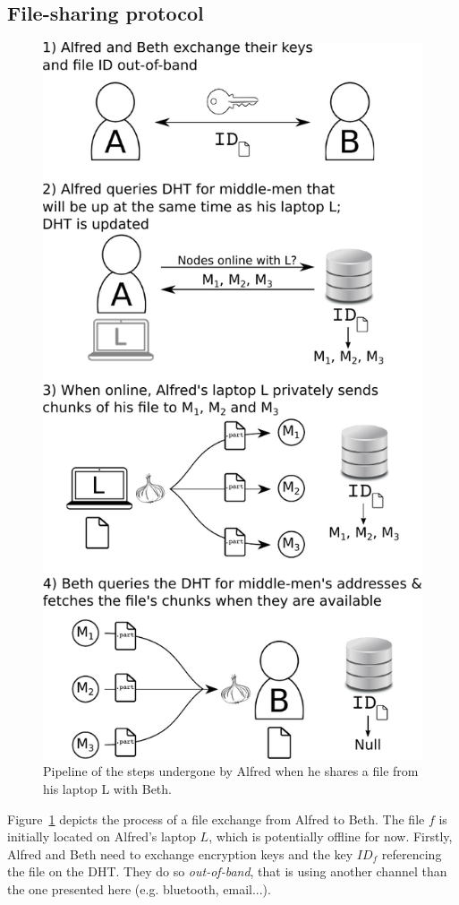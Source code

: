 \subsection{File-sharing protocol}

\begin{figure}[t]
\centering
\includegraphics[width=0.8\columnwidth]{figures/schema.pdf}
\caption{\label{fig:pipeline}Pipeline of the steps undergone by Alfred when he shares a file from his laptop L with Beth.}
\end{figure}

Figure~\ref{fig:pipeline} depicts the process of a file exchange from Alfred to Beth.
The file $f$ is initially located on Alfred's laptop $L$, which is potentially offline for now.
Firstly, Alfred and Beth need to exchange encryption keys and the key $ID_f$ referencing the file on the DHT.
They do so \emph{out-of-band}, that is using another channel than the one presented here (e.g. bluetooth, email...).

